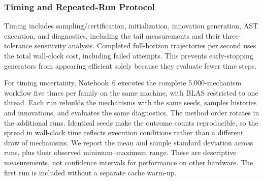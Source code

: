 \subsubsection{Timing and Repeated-Run Protocol}
Timing includes sampling/certification, initialization, innovation generation,
AST execution, and diagnostics, including the tail measurements and their
three-tolerance sensitivity analysis. Completed full-horizon trajectories per
second uses the total wall-clock cost, including failed attempts. This prevents
early-stopping generators from appearing efficient solely because they
evaluate fewer time steps.

For timing uncertainty, Notebook~6 executes the complete 5,000-mechanism
workflow five times per family on the same machine, with BLAS restricted to
one thread. Each run rebuilds the mechanisms with the same seeds, samples
histories and innovations, and evaluates the same diagnostics. The method
order rotates in the additional runs. Identical seeds make the outcome counts
reproducible, so the spread in wall-clock time reflects execution conditions
rather than a different draw of mechanisms. We report the mean and sample
standard deviation across runs, plus their observed minimum--maximum range.
These are descriptive measurements, not confidence intervals for performance
on other hardware. The first run is included without a separate cache warm-up.
